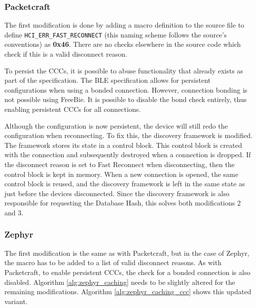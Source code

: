 \subsubsection{Packetcraft}
The first modification is done by adding a macro definition to the source file to define \texttt{HCI\_ERR\_FAST\_RECONNECT} (this naming scheme follows the source's conventions) as \textbf{0x46}. There are no checks elsewhere in the source code which check if this is a valid disconnect reason.

To persist the CCCs, it is possible to abuse functionality that already exists as part of the specification. The BLE specification allows for persistent configurations when using a bonded connection. However, connection bonding is not possible using FreeBie. It is possible to disable the bond check entirely, thus enabling persistent CCCs for all connections.

Although the configuration is now persistent, the device will still redo the configuration when reconnecting. To fix this, the discovery framework is modified. The framework stores its state in a control block. This control block is created with the connection and subsequently destroyed when a connection is dropped. If the disconnect reason is set to Fast Reconnect when disconnecting, then the control block is kept in memory. When a new connection is opened, the same control block is reused, and the discovery framework is left in the same state as just before the devices disconnected. Since the discovery framework is also responsible for requesting the Database Hash, this solves both modifications 2 and 3.

\subsubsection{Zephyr}
The first modification is the same as with Packetcraft, but in the case of Zephyr, the macro has to be added to a list of valid disconnect reasons. As with Packetcraft, to enable persistent CCCs, the check for a bonded connection is also disabled. Algorithm \ref{alg:zephyr_caching} needs to be slightly altered for the remaining modifications. Algorithm \ref{alg:zephyr_caching_ccc} shows this updated variant.

